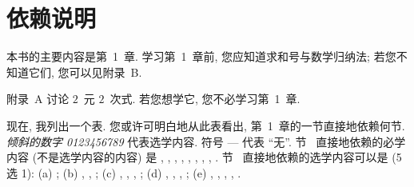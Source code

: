 \documentclass[../libro.tex]{subfiles}
\begin{document}
\ifSubfilesClassLoaded{\frontmatter}{}

\chapter{依赖说明}

本书的主要内容是第~1~章.
学习第~1~章前, 您应知道求和号与数学归纳法;
若您不知道它们, 您可以见附录~B.

附录~A 讨论 \(2\)~元 \(2\)~次式.
若您想学它, 您不必学习第~1~章.

现在, 我列出一个表.
您或许可明白地从此表看出,
第~1~章的一节直接地依赖何节.
\textit{\textsf{倾斜的数字 0123456789}}
代表选学内容.
符号 --- 代表 ``无''.
节~
直接地依赖的必学内容 (不是选学内容的内容) 是
,
,
,
,
,
,
,
,
.
节~
直接地依赖的选学内容可以是 (5 选 1):
(a)
;
(b)
,
,
;
(c)
,
,
,
;
(d)
,
,
,
;
(e)
,
,
,
,
.
\end{document}
